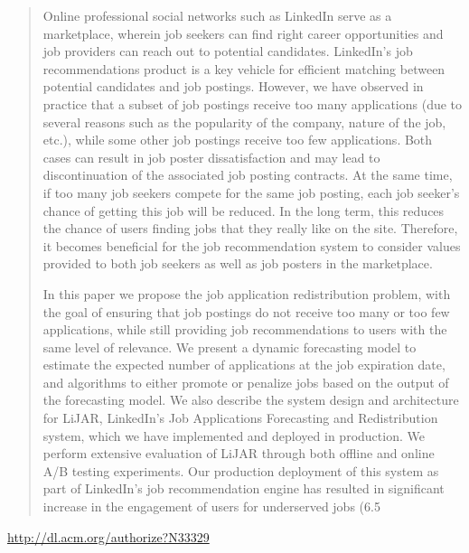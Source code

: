 \documentclass{article}
\begin{document}
\begin{quote}
Online professional social networks such as LinkedIn serve as a marketplace, wherein job seekers can find right career opportunities and job providers can reach out to potential candidates. LinkedIn’s job recommendations product is a key vehicle for efficient matching between potential candidates and job postings. However, we have observed in practice that a subset of job postings receive too many applications (due to several reasons such as the popularity of the company, nature of the job, etc.), while some other job postings receive too few applications. Both cases can result in job poster dissatisfaction and may lead to discontinuation of the associated job posting contracts. At the same time, if too many job seekers compete for the same job posting, each job seeker’s chance of getting this job will be reduced. In the long term, this reduces the chance of users finding jobs that they really like on the site. Therefore, it becomes beneficial for the job recommendation system to consider values provided to both job seekers as well as job posters in the marketplace.







  In this paper we propose the job application redistribution problem, with the goal of ensuring that job postings do not receive too many or too few applications, while still providing job recommendations to users with the same level of relevance. We present a dynamic forecasting model to estimate the expected number of applications at the job expiration date, and algorithms to either promote or penalize jobs based on the output of the forecasting model. We also describe the system design and architecture for LiJAR, LinkedIn’s Job Applications Forecasting and Redistribution system, which we have implemented and deployed in production. We perform extensive evaluation of LiJAR through both offline and online A/B testing experiments. Our production deployment of this system as part of LinkedIn’s job recommendation engine has resulted in significant increase in the engagement of users for underserved jobs (6.5%
\end{quote}

\href{http://dl.acm.org/authorize?N33329}{http://dl.acm.org/authorize?N33329}
\end{document}
